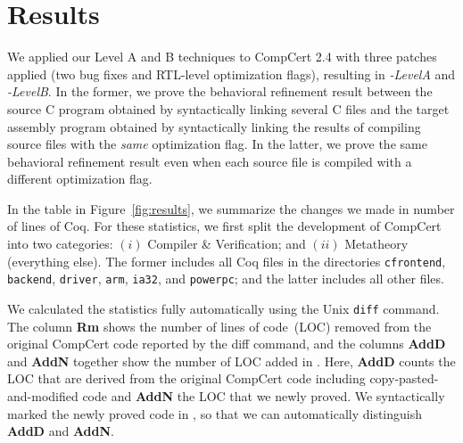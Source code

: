 \section{Results}

\newcommand{\specialcell}[2][c]{%
  \begin{tabular}[#1]{@{}c@{}}#2\end{tabular}}


We applied our Level A and B techniques to CompCert 2.4 with three
patches applied (two bug fixes and RTL-level optimization flags),
resulting in \emph{\sepcomp-LevelA} and \emph{\sepcomp-LevelB}.
In the former, we prove the behavioral refinement result between the
source C program obtained by syntactically linking several C files and
the target assembly program obtained by syntactically linking the
results of compiling source files with the \emph{same} optimization
flag.  In the latter, we prove the same behavioral refinement result
even when each source file is compiled with a different optimization
flag.

In the table in Figure~\ref{fig:results}, we summarize the changes we
made in number of lines of Coq.  For these statistics, we first split
the development of CompCert into two categories: $(i)$ Compiler \&
Verification; and $(ii)$ Metatheory (\ie everything else). The former
includes all Coq files in the directories \texttt{cfrontend},
\texttt{backend}, \texttt{driver}, \texttt{arm}, \texttt{ia32}, and
\texttt{powerpc}; and the latter includes all other files.

We calculated the statistics fully automatically using the Unix
\texttt{diff} command. The column \textbf{Rm} shows the number of
lines of code~(LOC) removed from the original CompCert code reported
by the diff command, and the columns \textbf{AddD} and \textbf{AddN}
together show the number of LOC added in \sepcomp.  Here,
\textbf{AddD} counts the LOC that are derived from the original
CompCert code including copy-pasted-and-modified code and \textbf{AddN}
the LOC that we newly proved. We syntactically marked the newly proved
code in \sepcomp, so that we can automatically distinguish
\textbf{AddD} and \textbf{AddN}.

